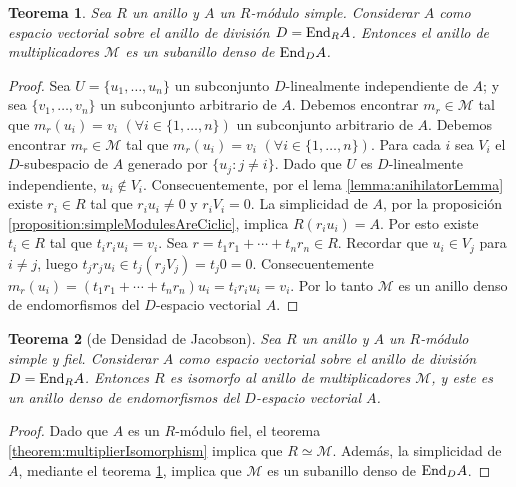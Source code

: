 \documentclass{report}
\newcommand{\End}{\textnormal{End}}
\newtheorem{theorem}{Teorema}
\begin{document}
  \begin{theorem}
    \label{theorem:denseMultiplierRing}
    Sea \(R\) un anillo y \(A\) un \(R\)-módulo simple.
    Considerar \(A\) como espacio vectorial sobre el anillo de división \(D = \End_R A\).
    Entonces el anillo de multiplicadores \(\mathcal{M}\) es un subanillo denso de \(\End_D A\).
  \end{theorem}
  \begin{proof}
    Sea \(U = \{u_1, \dots, u_n\}\) un subconjunto \(D\)-linealmente independiente de \(A\);
    y sea \(\{v_1, \dots, v_n\}\) un subconjunto arbitrario de \(A\).
    Debemos encontrar \(m_r \in \mathcal{M}\) tal que \(m_r(u_i) = v_i\) \((\forall i \in \{1, \dots, n\})\) un subconjunto arbitrario de \(A\).
    Debemos encontrar \(m_r \in \mathcal{M}\) tal que \(m_r(u_i) = v_i\) \((\forall i \in \{1, \dots, n\})\).
    Para cada \(i\) sea \(V_i\) el \(D\)-subespacio de \(A\) generado por \(\{u_j : j \neq i\}\).
    Dado que \(U\) es \(D\)-linealmente independiente, \(u_i \notin V_i\).
    Consecuentemente, por el lema \ref{lemma:anihilatorLemma} existe \(r_i \in R\) tal que \(r_i u_i \neq 0\) y \(r_i V_i = 0\).
    La simplicidad de \(A\), por la proposición \ref{proposition:simpleModulesAreCiclic}, implica \(R (r_i u_i) = A\).
    Por esto existe \(t_i \in R\) tal que \(t_i r_i u_i = v_i\).
    Sea \(r = t_1 r_1 + \cdots + t_n r_n \in R\).
    Recordar que \(u_i \in V_j\) para \(i \neq j\), luego \(t_j r_j u_i \in t_j (r_j V_j) = t_j 0 = 0\).
    Consecuentemente \(m_r(u_i) = (t_1 r_1 + \cdots + t_n r_n) u_i = t_i r_i u_i = v_i\).
    Por lo tanto \(\mathcal{M}\) es un anillo denso de endomorfismos del \(D\)-espacio vectorial \(A\).
  \end{proof}

  \begin{theorem}[de Densidad de Jacobson]
    \label{theorem:jacobsonDensityTheorem}
    Sea \(R\) un anillo y \(A\) un \(R\)-módulo simple y fiel.
    Considerar \(A\) como espacio vectorial sobre el anillo de división \(D = \End_R A\).
    Entonces \(R\) es isomorfo al anillo de multiplicadores \(\mathcal{M}\), y este es un anillo denso de endomorfismos del \(D\)-espacio vectorial \(A\).
  \end{theorem}
  \begin{proof}
    Dado que \(A\) es un \(R\)-módulo fiel, el teorema \ref{theorem:multiplierIsomorphism} implica que \(R \simeq \mathcal{M}\).
    Además, la simplicidad de \(A\), mediante el teorema \ref{theorem:denseMultiplierRing}, implica que \(\mathcal{M}\) es un subanillo denso de \(\End_D A\).
  \end{proof}
\end{document}
